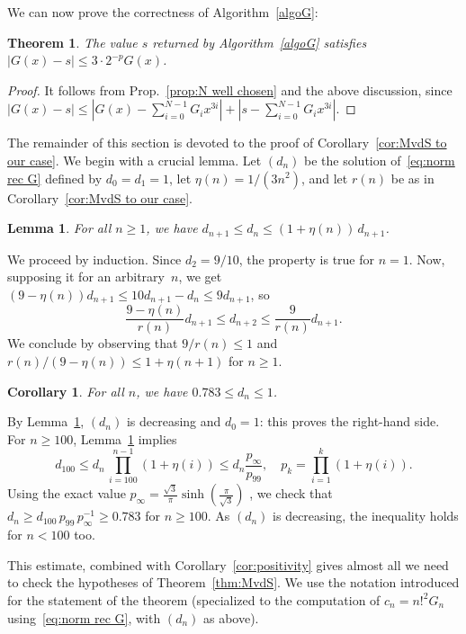 \documentclass[10pt, conference]{IEEEtran}
\newcommand{\ttarget}{p}
\newtheorem{corollary}{Corollary}
\newtheorem{lemma}{Lemma}
\newtheorem{theorem}{Theorem}
\begin{document}
We can now prove the correctness of Algorithm~\ref{algoG}:
\begin{theorem}
  The value $s$ returned by Algorithm~\ref{algoG} satisfies $|G(x)-s| \le 3\cdot 2^{-\ttarget} G(x)$.
\end{theorem}
\begin{proof}
  It follows from Prop.~\ref{prop:N well chosen} and the above discussion, since $|G(x)-s| \le |G(x) - \sum_{i=0}^{N-1} G_i x^{3i}| + |s - \sum_{i=0}^{N-1} G_i x^{3i}|$.
\end{proof}
The remainder of this section is devoted to the proof of Corollary~\ref{cor:MvdS to our case}.
We begin with a crucial lemma.
Let $(d_n)$ be the solution of~\eqref{eq:norm rec G} defined by $d_0 = d_1 = 1$, let $\eta(n)=1/(3n^2)$, and let $r(n)$ be as in Corollary~\ref{cor:MvdS to our case}.
\begin{lemma} \mightbeomitted
  \label{lem:bound dn}
  For all $n \ge 1$, we have $d_{n+1} \le d_n \le (1+\eta(n))\,d_{n+1}$.
\end{lemma}
\begin{IEEEproof}
  We proceed by induction. Since $d_2 = 9/10$,  the property is true for $n=1$. Now, supposing it for an arbitrary~$n$, we get $(9-\eta(n)) d_{n+1} \le 10d_{n+1}-d_n \le 9d_{n+1}$, so
\[ 
  \frac{9-\eta(n)}{r(n)} d_{n+1} \le d_{n+2} \le \frac{9}{r(n)}d_{n+1}.
\]
We conclude by observing that $9/r(n) \le 1$ and $r(n)/(9-\eta(n)) \le 1+\eta(n+1)$ for $n \ge 1$.
\end{IEEEproof}
\begin{corollary} \mightbeomitted
  \label{cor:estim dn}
  For all $n$, we have $0.783 \le d_n \le 1$.
\end{corollary}
\begin{IEEEproof}
  By Lemma~\ref{lem:bound dn}, $(d_n)$ is decreasing and $d_0 = 1$: this proves the right-hand side.
  For $n \geq 100$, Lemma~\ref{lem:bound dn} implies
\[ d_{100} \le d_n\,\prod_{i=100}^{n-1} (1+\eta(i))
  \le d_n \frac{p_{\infty}}{p_{99}}, \quad p_k=\prod_{i=1}^k (1+\eta(i)).
\]
Using the exact value
$p_{\infty} = \frac{\sqrt{3}}{\pi} \sinh(\frac{\pi}{\sqrt{3}})$
\cite[Eq.~4.36.1]{DLMF},
we check that
$d_n \geq d_{100} \, p_{99} \, p_{\infty}^{-1} \geq 0.783$
for $n \geq 100$.
As $(d_n)$ is decreasing, the inequality holds for $n<100$ too.
\end{IEEEproof}

This estimate, combined with Corollary~\ref{cor:positivity} gives almost all we need to check the hypotheses of Theorem~\ref{thm:MvdS}. We use the notation introduced for the statement of the theorem (specialized to the computation of $c_n=n!^2 G_n$ using~\eqref{eq:norm rec G}, with $(d_n)$ as above).
\end{document}
